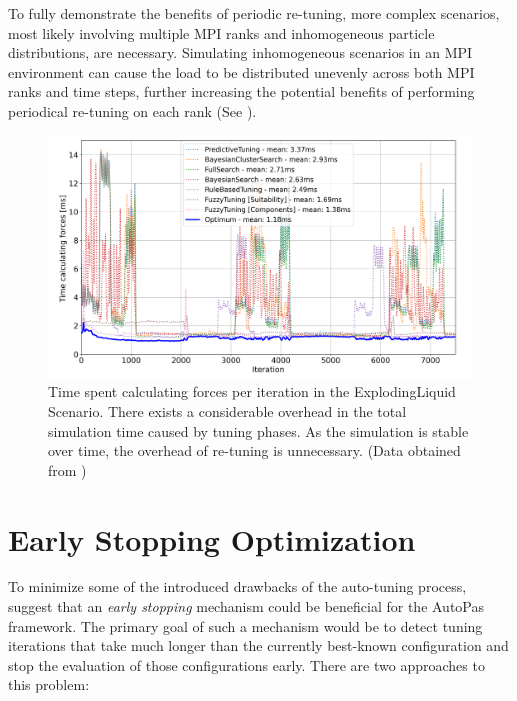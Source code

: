 \documentclass[conference]{IEEEtran}
\begin{document}
To fully demonstrate the benefits of periodic re-tuning, more complex scenarios, most likely involving multiple MPI ranks and inhomogeneous particle distributions, are necessary. Simulating inhomogeneous scenarios in an MPI environment can cause the load to be distributed unevenly across both MPI ranks and time steps, further increasing the potential benefits of performing periodical re-tuning on each rank (See \cite{Newcome2023Poster}).

\begin{figure}[h]
    \centering
    \includegraphics[width=\columnwidth]{figures/unnecessary-tuning-phases.png}
    \caption{
        Time spent calculating forces per iteration in the ExplodingLiquid Scenario. There exists a considerable overhead in the total simulation time caused by tuning phases. As the simulation is stable over time, the overhead of re-tuning is unnecessary. (Data obtained from \cite{lerchner2024})
    }
    \label{fig:unnecessary-tuning-phases}
\end{figure}

\newpage

\section{Early Stopping Optimization}

To minimize some of the introduced drawbacks of the auto-tuning process, \cite{endreport.pdf}\cite{Manuel_Lerchner_Thesis.pdf}\cite{autopas_issue673} suggest that an \textit{early stopping} mechanism could be beneficial for the AutoPas framework. The primary goal of such a mechanism would be to detect tuning iterations that take much longer than the currently best-known configuration and stop the evaluation of those configurations early. There are two approaches to this problem:
\end{document}
